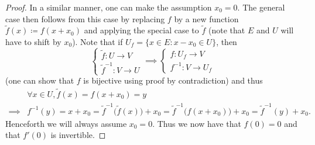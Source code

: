 \begin{proof}
  In a similar manner, one can make the assumption \(x_0 = 0\).
  The general case then follows from this case by replacing \(f\) by a new function
  \(\tilde{f}(x) \coloneqq f(x + x_0)\) and applying the special case to \(\tilde{f}\)
  (note that \(E\) and \(U\) will have to shift by \(x_0\)).
  Note that if \(U_f = \{x \in E : x - x_0 \in U\}\), then
  \[
    \begin{cases}
      \tilde{f} : U \to V \\
      \tilde{f}^{-1} : V \to U
    \end{cases} \implies \begin{cases}
      f : U_f \to V \\
      f^{-1} : V \to U_f
    \end{cases}
  \]
  (one can show that \(f\) is bijective using proof by contradiction)
  and thus
  \begin{align*}
             & \forall x \in U, \tilde{f}(x) = f(x + x_0) = y                                                                                         \\
    \implies & f^{-1}(y) = x + x_0 = \tilde{f}^{-1}\big(\tilde{f}(x)\big) + x_0 = \tilde{f}^{-1}\big(f(x + x_0)\big) + x_0 = \tilde{f}^{-1}(y) + x_0.
  \end{align*}
  Henceforth we will always assume \(x_0 = 0\).
  Thus we now have that \(f(0) = 0\) and that \(f'(0)\) is invertible.


\end{proof}
